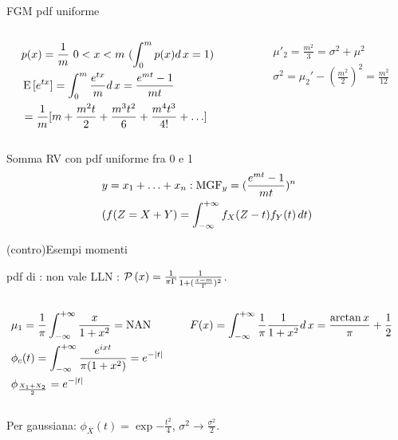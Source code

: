 \documentclass[asd-beamer.tex]{subfiles}
\begin{document}
\begin{wordonframe}{FGM pdf uniforme}
\begin{columns}[T]
\begin{column}{0.5\textwidth}
\begin{align*}
&p(x)=\frac{1}{m}\ 0<x<m\ (\int_0^mp(x)d\,x=1)\\
&\operatorname{E}{[e^{tx}]}=\int_0^m\frac{e^{tx}}{m}d\,x=\frac{e^{mt}-1}{mt}\\
&=\frac{1}{m}[m+\frac{m^2t}{2}+\frac{m^3t^2}{6}+\frac{m^4t^3}{4!}+\ldots]
\end{align*}
\end{column}
\begin{column}{0.5\textwidth}
\begin{align*}
&\mu'_2=\frac{m^2}{3}=\sigma^2+\mu^2\\
&\sigma^2=\mu_2'-(\frac{m^2}{2})^2=\frac{m^2}{12}
\end{align*}
\end{column}
\end{columns}
\begin{block}{Somma RV con pdf uniforme fra 0 e 1}
\begin{align*}
&y=x_1+\ldots+x_n: \operatorname{MGF}_y=(\frac{e^{mt}-1}{mt})^n\\
&(f(Z=X+Y)=\int_{-\infty}^{+\infty}{}f_X(Z-t)f_Y(t)\,dt)
\end{align*}
\end{block}
\end{wordonframe}

\begin{wordonframe}{(contro)Esempi momenti}
\begin{block}{pdf di : non vale LLN}
: $\operatorname{\mathcal{P}}{(x)}=\frac{1}{\pi\Gamma}\frac{1}{1+(\frac{x-m}{\Gamma})^2}$.
\begin{columns}[T]
\begin{column}{0.5\textwidth}
\begin{align*}
&\mu_1=\frac{1}{\pi}\int_{-\infty}^{+\infty}{}\frac{x}{1+x^2}=\operatorname{NAN}{}\\
&\phi_c(t)=\int_{-\infty}^{+\infty}{}\frac{e^{ixt}}{\pi(1+x^2)}=e^{-|t|}\\
&\phi_{\frac{X_1+X_2}{2}}=e^{-|t|}
\end{align*}
\end{column}
\begin{column}{0.5\textwidth}
\begin{align*}
&F(x)=\int_{-\infty}^{+\infty}{}\frac{1}{\pi}\frac{1}{1+x^2}d\,x=\frac{\arctan{x}}{\pi}+\frac{1}{2}
\end{align*}
\end{column}
\end{columns}
Per gaussiana: $\phi_{\overline{X}}(t)=\exp{-\frac{t^2}{4}}$, $\sigma^2\to\frac{\sigma^2}{2}$.
\end{block}
\end{wordonframe}
\end{document}
